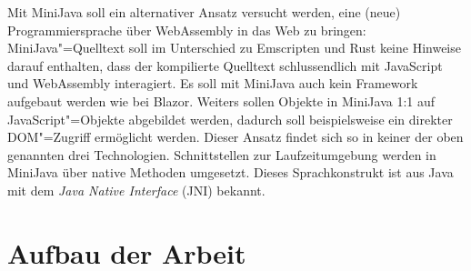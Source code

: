 Mit MiniJava soll ein alternativer Ansatz versucht werden, eine (neue) Programmiersprache über WebAssembly in das Web zu bringen: MiniJava"=Quelltext soll im Unterschied zu Emscripten und Rust keine Hinweise darauf enthalten, dass der kompilierte Quelltext schlussendlich mit JavaScript und WebAssembly interagiert. Es soll mit MiniJava auch kein Framework aufgebaut werden wie bei Blazor. Weiters sollen Objekte in MiniJava 1:1 auf JavaScript"=Objekte abgebildet werden, dadurch soll beispielsweise ein direkter DOM"=Zugriff ermöglicht werden. Dieser Ansatz findet sich so in keiner der oben genannten drei Technologien. Schnittstellen zur Laufzeitumgebung werden in MiniJava über native Methoden umgesetzt. Dieses Sprachkonstrukt ist aus Java mit dem \emph{Java Native Interface} (JNI) bekannt.

\section{Aufbau der Arbeit}

